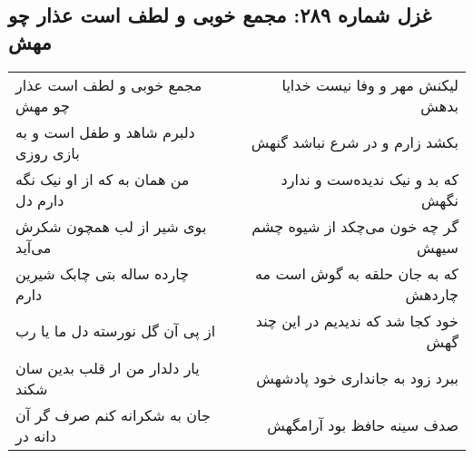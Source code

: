 \begin{center}
\section*{غزل شماره ۲۸۹: مجمع خوبی و لطف است عذار چو مهش}
\label{sec:sh289}
\begin{longtable}{l p{0.5cm} r}
مجمع خوبی و لطف است عذار چو مهش
&&
لیکنش مهر و وفا نیست خدایا بدهش
\\
دلبرم شاهد و طفل است و به بازی روزی
&&
بکشد زارم و در شرع نباشد گنهش
\\
من همان به که از او نیک نگه دارم دل
&&
که بد و نیک ندیده‌ست و ندارد نگهش
\\
بوی شیر از لب همچون شکرش می‌آید
&&
گر چه خون می‌چکد از شیوه چشم سیهش
\\
چارده ساله بتی چابک شیرین دارم
&&
که به جان حلقه به گوش است مه چاردهش
\\
از پی آن گل نورسته دل ما یا رب
&&
خود کجا شد که ندیدیم در این چند گهش
\\
یار دلدار من ار قلب بدین سان شکند
&&
ببرد زود به جانداری خود پادشهش
\\
جان به شکرانه کنم صرف گر آن دانه در
&&
صدف سینه حافظ بود آرامگهش
\\
\end{longtable}
\end{center}
